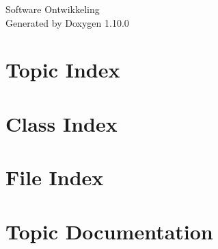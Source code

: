 \documentclass[twoside]{book}
\newcommand{\+}{\discretionary{\mbox{\scriptsize$\hookleftarrow$}}{}{}}
\newcommand{\clearemptydoublepage}{%
    \newpage{\pagestyle{empty}\cleardoublepage}%
  }
\begin{document}
  \raggedbottom
    \hypersetup{pageanchor=false,
                bookmarksnumbered=true,
                pdfencoding=unicode
               }
  \begin{titlepage}
  \vspace*{7cm}
  \begin{center}%
  {\Large Software Ontwikkeling}\\
  \vspace*{1cm}
  {\large Generated by Doxygen 1.10.0}\\
  \end{center}
  \end{titlepage}
  \clearemptydoublepage
  \tableofcontents
  \clearemptydoublepage
  \hypersetup{pageanchor=true}

\chapter{Topic Index}

\chapter{Class Index}

\chapter{File Index}

\chapter{Topic Documentation}







\end{document}
